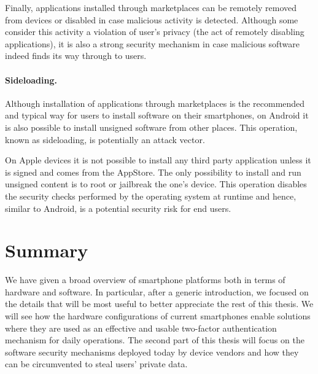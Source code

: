 Finally, applications installed through marketplaces can be remotely removed from devices or disabled in case malicious activity is detected. Although some consider this activity a violation of user's privacy (the act of remotely disabling applications), it is also a strong security mechanism in case malicious software indeed finds its way through to users.

\paragraph{Sideloading.} Although installation of applications through marketplaces is the recommended and typical way for users to install software on their smartphones, on Android it is also possible to install unsigned software from other places. This operation, known as sideloading, is potentially an attack vector.

On Apple devices it is not possible to install any third party application unless it is signed and comes from the AppStore. The only possibility to install and run unsigned content is to root or jailbreak the one's device. This operation disables the security checks performed by the operating system at runtime and hence, similar to Android, is a potential security risk for end users.

\section{Summary}

We have given a broad overview of smartphone platforms both in terms of hardware and software. In particular, after a generic introduction, we focused on the details that will be most useful to better appreciate the rest of this thesis. We will see how the hardware configurations of current smartphones enable solutions where they are used as an effective and usable two-factor authentication mechanism for daily operations. The second part of this thesis will focus on the software security mechanisms deployed today by device vendors and how they can be circumvented to steal users' private data.


